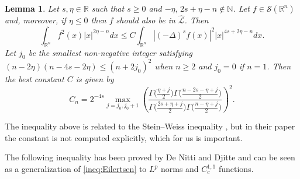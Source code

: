 \documentclass[11pt, twoside, notitlepage]{amsart}
\newtheorem{lemma}[theorem]{Lemma}
\newcommand\R{\mathbb{R}}
\numberwithin{equation}{section}
\begin{document}




\begin{lemma}\label{Lemma:Eilertsen}\cite[Thm. 16]{EilertsenJFA2001}
Let $s, \eta \in \mathbb{R}$ such that $s \ge 0$  and  $-\eta,\, 2s+\eta-n\not\in \mathbb{N}$. Let $f \in \mathcal{S}(\R^n)$ and, moreover, if $\eta \le 0$ then $f$ should also be in $\widehat{\mathcal{L}}$. Then
\begin{equation}\label{ineq:Eilertsen}
	\int_{\R^{n}} f^2(x) |x|^{2\eta - n} dx  \le C \int_{\R^{n}} | (-\Delta)^{s}  f(x)|^2  |x|^{ 4s +2\eta - n} dx.
\end{equation}
Let $j_0$ be the smallest non-negative integer satisfying $(n - 2\eta )( n-4s-2\eta ) \le (n + 2j_0)^2$  when $n\ge 2$ and $j_0=0$ if $n=1$.  Then
	the best constant $C$ is given by
\begin{equation}\label{CNd}
 C_{n}= 2^{-4s} \max_{j=j_0, j_0+1} \left(  \frac{ \Gamma\big( \frac{\eta+j}{2} \big)   \Gamma\big( \frac{n-2s-\eta+j}{2} \big)   }
{ \Gamma\big( \frac{2s+\eta+j}{2} \big)   \Gamma\big( \frac{n-\eta+j}{2} \big)   } \right)^2.
\end{equation}
\end{lemma}

The inequality above  is related to the Stein–Weiss inequality \cite[Thm.B*]{Stein-Weiss}, but in their paper the constant is not computed explicitly, which for us is important.

The following inequality  has been proved by De Nitti and Djitte  and can be seen as a generalization of \eqref{ineq:Eilertsen} to $L^p$ norms and $C^{1,1}_c$ functions.
\end{document}
